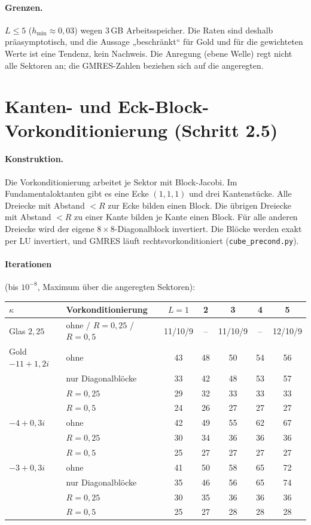 \documentclass[11pt, a4paper]{article}
\begin{document}
\paragraph{Grenzen.} $L\le5$ ($h_{\min}\approx0{,}03$) wegen 3\,GB Arbeitsspeicher. Die
Raten sind deshalb präasymptotisch, und die Aussage „beschränkt“ für Gold und für die
gewichteten Werte ist eine Tendenz, kein Nachweis. Die Anregung (ebene Welle) regt nicht
alle Sektoren an; die GMRES-Zahlen beziehen sich auf die angeregten.

\section{Kanten- und Eck-Block-Vorkonditionierung (Schritt 2.5)}\label{sec:vorkond3d}

\paragraph{Konstruktion.} Die Vorkonditionierung arbeitet je Sektor mit Block-Jacobi.
Im Fundamentaloktanten gibt es eine Ecke $(1,1,1)$ und drei Kantenstücke. Alle Dreiecke
mit Abstand $<R$ zur Ecke bilden einen Block. Die übrigen Dreiecke mit Abstand $<R$ zu
einer Kante bilden je Kante einen Block. Für alle anderen Dreiecke wird der eigene
$8\times8$-Diagonalblock invertiert. Die Blöcke werden exakt per LU invertiert, und
GMRES läuft rechtsvorkonditioniert (\texttt{cube\_precond.py}).

\paragraph{Iterationen} (bis $10^{-8}$, Maximum über die angeregten Sektoren):
\begin{center}\small
\begin{tabular}{llccccc}
\toprule
$\kappa$ & Vorkonditionierung & $L=1$ & 2 & 3 & 4 & 5\\
\midrule
Glas $2{,}25$ & ohne / $R=0{,}25$ / $R=0{,}5$ & 11/10/9 & -- & 11/10/9 & -- & 12/10/9\\
Gold $-11+1{,}2i$ & ohne & 43 & 48 & 50 & 54 & 56\\
 & nur Diagonalblöcke & 33 & 42 & 48 & 53 & 57\\
 & $R=0{,}25$ & 29 & 32 & 33 & 33 & 33\\
 & $R=0{,}5$ & 24 & 26 & 27 & 27 & 27\\
$-4+0{,}3i$ & ohne & 42 & 49 & 55 & 62 & 67\\
 & $R=0{,}25$ & 30 & 34 & 36 & 36 & 36\\
 & $R=0{,}5$ & 25 & 27 & 27 & 27 & 27\\
$-3+0{,}3i$ & ohne & 41 & 50 & 58 & 65 & 72\\
 & nur Diagonalblöcke & 35 & 46 & 56 & 65 & 74\\
 & $R=0{,}25$ & 30 & 35 & 36 & 36 & 36\\
 & $R=0{,}5$ & 25 & 27 & 28 & 28 & 28\\
\bottomrule
\end{tabular}
\end{center}
\end{document}
